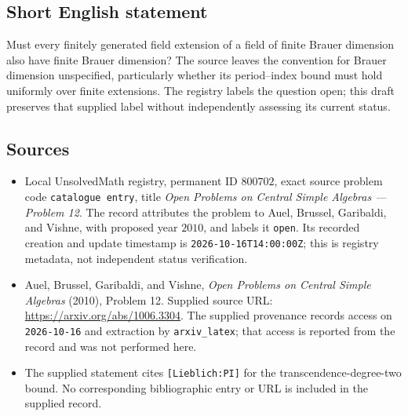 \documentclass[11pt]{article}
\begin{document}
\subsection{Short English statement}
Must every finitely generated field extension of a field of finite Brauer dimension also have finite Brauer dimension? The source leaves the convention for Brauer dimension unspecified, particularly whether its period--index bound must hold uniformly over finite extensions. The registry labels the question open; this draft preserves that supplied label without independently assessing its current status.
\subsection{Sources}
\begin{itemize}
\item Local UnsolvedMath registry, permanent ID \(800702\), exact source problem code \texttt{catalogue entry}, title \emph{Open Problems on Central Simple Algebras --- Problem 12}. The record attributes the problem to Auel, Brussel, Garibaldi, and Vishne, with proposed year \(2010\), and labels it \texttt{open}. Its recorded creation and update timestamp is \texttt{2026-10-16T14:00:00Z}; this is registry metadata, not independent status verification.
\item Auel, Brussel, Garibaldi, and Vishne, \emph{Open Problems on Central Simple Algebras} (2010), Problem 12. Supplied source URL: \url{https://arxiv.org/abs/1006.3304}. The supplied provenance records access on \texttt{2026-10-16} and extraction by \texttt{arxiv\_latex}; that access is reported from the record and was not performed here.
\item The supplied statement cites \texttt{[Lieblich:PI]} for the transcendence-degree-two bound. No corresponding bibliographic entry or URL is included in the supplied record.
\end{itemize}
\end{document}
